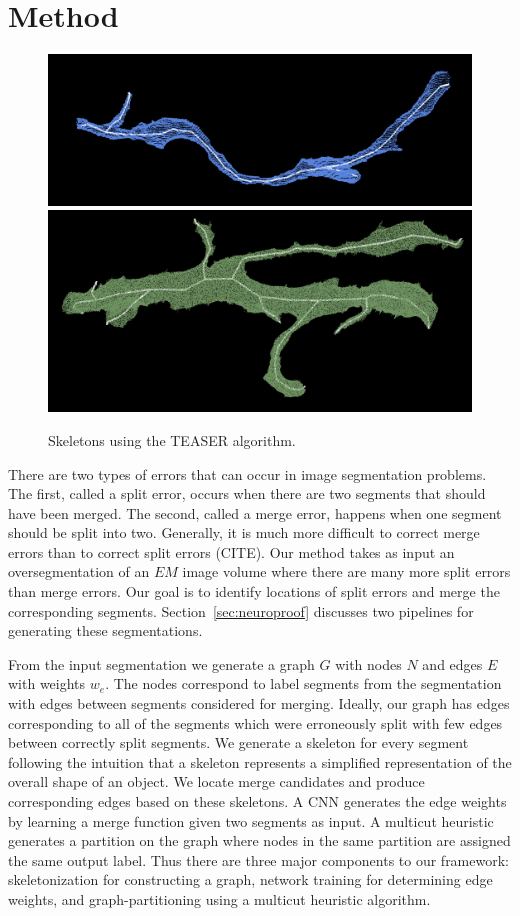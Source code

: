 \section{Method}


\begin{figure}[t]
	\centering
	\includegraphics[width=0.92\linewidth]{./figures/skeleton1.png}
	\includegraphics[width=0.92\linewidth]{./figures/skeleton2.png}
	\caption{Skeletons using the TEASER algorithm.}
	\label{fig:skeletonization}
\end{figure}

There are two types of errors that can occur in image segmentation problems.
The first, called a split error, occurs when there are two segments that should have been merged.
The second, called a merge error, happens when one segment should be split into two.
Generally, it is much more difficult to correct merge errors than to correct split errors (CITE). 
Our method takes as input an oversegmentation of an $EM$ image volume where there are many more split errors than merge errors.
Our goal is to identify locations of split errors and merge the corresponding segments.
Section~\ref{sec:neuroproof} discusses two pipelines for generating these segmentations.

From the input segmentation we generate a graph $G$ with nodes $N$ and edges $E$ with weights $w_e$. 
The nodes correspond to label segments from the segmentation with edges between segments considered for merging.
Ideally, our graph has edges corresponding to all of the segments which were erroneously split with few edges between correctly split segments.
We generate a skeleton for every segment following the intuition that a skeleton represents a simplified representation of the overall shape of an object. 
We locate merge candidates and produce corresponding edges based on these skeletons.
A CNN generates the edge weights by learning a merge function given two segments as input. 
A multicut heuristic generates a partition on the graph where nodes in the same partition are assigned the same output label. 
Thus there are three major components to our framework: skeletonization for constructing a graph, network training for determining edge weights, and graph-partitioning using a multicut heuristic algorithm.

